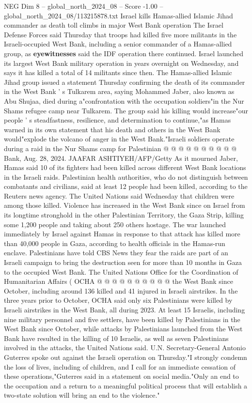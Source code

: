 \begin{textsample}{NEG Dim 8 – global\_north\_2024\_08 – Score -1.00 – global\_north\_2024\_08/113215878.txt}  \label{ex:f8_neg_424}
Israel kills Hamas-allied Islamic Jihad commander as death toll climbs in major West Bank operation The Israel Defense Forces said Thursday that troops had killed five more militants in the Israeli-occupied West Bank, including a senior commander of a Hamas-allied group, as \textbf{eyewitnesses} said the IDF operation there continued.
Israel launched its largest West Bank military operation in years overnight on Wednesday, and says it has killed a total of 14 militants since then.
The Hamas-allied Islamic Jihad group issued a statement Thursday confirming the death of its commander in the West Bank ' s Tulkarem area, saying Mohammed Jaber, also known as Abu Shujaa, died during a"confrontation with the occupation soldiers"in the Nur Shams refugee camp near Tulkarem.
The group said his killing would increase"our people ' s steadfastness, resilience, and determination to continue,"as Hamas warned in its own statement that his death and others in the West Bank would"explode the volcano of anger in the West Bank."Israeli soldiers operate during a raid in the Nur Shams camp for Palestinian @ @ @ @ @ @ @ @ @ @ Bank, Aug. 28, 2024.
JAAFAR ASHTIYEH/AFP/Getty As it mourned Jaber, Hamas said 10 of its fighters had been killed across different West Bank locations in the Israeli raids.
Palestinian health authorities, who do not distinguish between combatants and civilians, said at least 12 people had been killed, according to the Reuters news agency.
The United Nations said Wednesday that children were among those killed.
Violence has increased in the West Bank since on Israel from its longtime stronghold in the other Palestinian Territory, the Gaza Strip, killing some 1,200 people and taking about 250 others hostage.
The war launched immediately by Israel against Hamas in response to that attack has killed more than 40,000 people in Gaza, according to health officials in the Hamas-run enclave.
Palestinians have told CBS News they fear the raids are part of an Israeli campaign to bring the destruction seen for more than 10 months in Gaza to the occupied West Bank.
The United Nations Office for the Coordination of Humanitarian Affairs ( OCHA @ @ @ @ @ @ @ @ @ @ the West Bank since October, including around 136 killed and 41 injured in Israeli airstrikes.
In the three years prior to October, OCHA said only six Palestinians were killed by Israeli airstrikes in the West Bank, all during 2023.
At least 15 Israelis, including nine military personnel and five settlers, have been killed by Palestinians in the West Bank since October, while attacks by Palestinians launched from the West Bank have resulted in the killing of 10 Israelis, as well as seven Palestinians involved in the attacks, the United Nations said.
U.N.
Secretary-General Antonio Guterres spoke out against the Israeli operation on Thursday."I strongly condemn the loss of lives, including of children, and I call for an immediate cessation of these operations,"Guterres said in a statement on social media."Only an end to the occupation and a return to a meaningful political process that will establish a two-state solution will bring an end to the violence."

\end{textsample}
